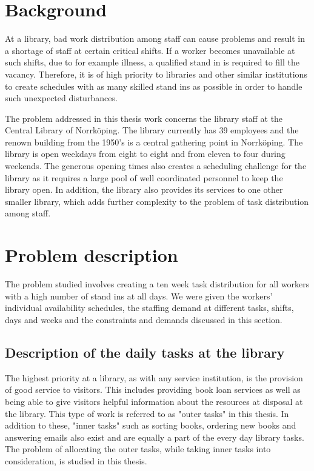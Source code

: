 
\section{Background}


At a library, bad work distribution among staff can cause problems and result in a shortage of staff at certain critical shifts. If a worker becomes unavailable at such shifts, due to for example illness, a qualified stand in is required to fill the vacancy. Therefore, it is of high priority to libraries and other similar institutions to create schedules with as many skilled stand ins as possible in order to handle such unexpected disturbances. 

The problem addressed in this thesis work concerns the library staff at the Central Library of Norrköping. The library currently has 39 employees and the renown building from the 1950's is a central gathering point in Norrköping. The library is open weekdays from eight to eight and from eleven to four during weekends. The generous opening times also creates a scheduling challenge for the library as it requires a large pool of well coordinated personnel to keep the library open. In addition, the library also provides its services to one other smaller library, which adds further complexity to the problem of task distribution among staff.

\section{Problem description}

The problem studied involves creating a ten week task distribution for all workers with a high number of stand ins at all days. We were given the workers' individual availability schedules, the staffing demand at different tasks, shifts, days and weeks and the constraints and demands discussed in this section. 

\subsection{Description of the daily tasks at the library} \label{section:library_tasks}
The highest priority at a library, as with any service institution, is the provision of good service to visitors. This includes providing book loan services as well as being able to give visitors helpful information about the resources at disposal at the library. This type of work is referred to as "outer tasks" in this thesis. In addition to these, "inner tasks" such as sorting books, ordering new books and answering emails also exist and are equally a part of the every day library tasks. The problem of allocating the outer tasks, while taking inner tasks into consideration, is studied in this thesis.

